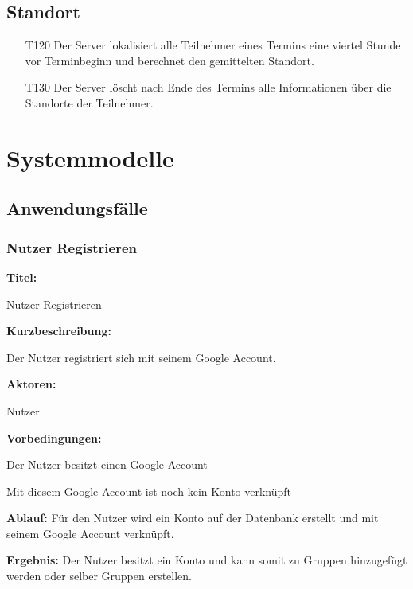 \documentclass{scrartcl}
\begin{document}
	\subsection{Standort}
	\begin{itemize}
		\item[T120] Der Server lokalisiert alle Teilnehmer eines Termins eine viertel Stunde vor Terminbeginn und berechnet den gemittelten Standort. 
		\item[T130] Der Server löscht nach Ende des Termins alle Informationen über die Standorte der Teilnehmer. 
	 \end{itemize}	
	
	\newpage
	
	
	\section{Systemmodelle}
	
	\subsection{Anwendungsfälle}
	\subsubsection{Nutzer Registrieren}
	\begin{description}
		\item \textbf{Titel:}
		\begin{description}
			\item Nutzer Registrieren
		\end{description}
		\item \textbf{Kurzbeschreibung:}
		\begin{description}
			\item Der Nutzer registriert sich mit seinem Google Account.
		\end{description}
		\item \textbf{Aktoren:}
		\begin{description}
			\item Nutzer 
		\end{description}
		\item \textbf{Vorbedingungen:}
		\begin{description}
			\item Der Nutzer besitzt einen Google Account
			\item Mit diesem Google Account ist noch kein Konto verknüpft
		\end{description}
		\item \textbf{Ablauf:} \newline Für den Nutzer wird ein Konto auf der Datenbank erstellt und mit seinem Google Account verknüpft.
		\item \textbf{Ergebnis:} \newline Der Nutzer besitzt ein Konto und kann somit zu Gruppen hinzugefügt werden oder selber Gruppen erstellen.
	\end{description}
	
\end{document}
